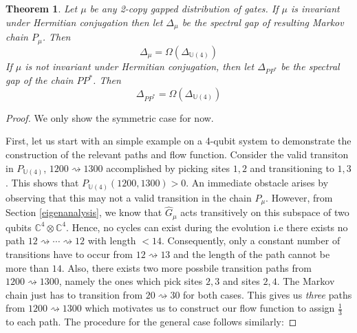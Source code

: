 \documentclass[12pt]{amsart}
\newtheorem{theorem}{Theorem}[section]
\theoremstyle{definition}
\theoremstyle{remark}
\numberwithin{equation}{section}
\theoremstyle{remark}
\begin{document}

\begin{theorem}
  Let $\mu$ be any 2-copy gapped distribution of gates. If $\mu$ is invariant under Hermitian conjugation then let $\Delta_\mu$ be the spectral gap of resulting Markov chain $P_\mu$. Then
  \begin{equation}
    \Delta_\mu = \Omega(\Delta_{\mathbb{U}(4)})
  \end{equation}
  If $\mu$ is not invariant under Hermitian conjugation, then let $\Delta_{PP^*}$ be the spectral gap of the chain $PP^*$. Then
  \begin{equation}
    \Delta_{PP^*} = \Omega(\Delta_{\mathbb{U}(4)})
  \end{equation}
\end{theorem}
\begin{proof}
  We only show the symmetric case for now. \newline

  First, let us start with an simple example on a 4-qubit system to demonstrate the construction of the relevant paths and flow function. Consider the valid transiton in $P_{\mathbb{U}(4)}$, $1200 \rightsquigarrow 1300$ accomplished by picking sites $1,2$ and transitioning to $1,3$. This shows that $P_{\mathbb{U}(4)}(1200,1300) > 0$. An immediate obstacle arises by observing that this may not a valid transition in the chain $P_\mu$. However, from Section \ref{eigenanalysis}, we know that $\hat{G}_{\mu}$ acts transitively on this subspace of two qubits $\mathbb{C}^4 \otimes \mathbb{C}^4$. Hence, no cycles can exist during the evolution i.e there exists no path $12 \rightsquigarrow \cdots \rightsquigarrow 12$ with length $< 14$. Consequently, only a constant number of transitions have to occur from $12 \rightsquigarrow 13$ and the length of the path cannot be more than $14$. Also, there exists two more possbile transition paths from $1200 \rightsquigarrow 1300$, namely the ones which pick sites $2,3$ and sites $2,4$. The Markov chain just has to transition from $20 \rightsquigarrow 30$ for both cases. This gives us \emph{three} paths from $1200 \rightsquigarrow 1300$ which motivates us to construct our flow function to assign $\frac{1}{3}$ to each path. The procedure for the general case follows similarly: \newline


\end{proof}
\end{document}

